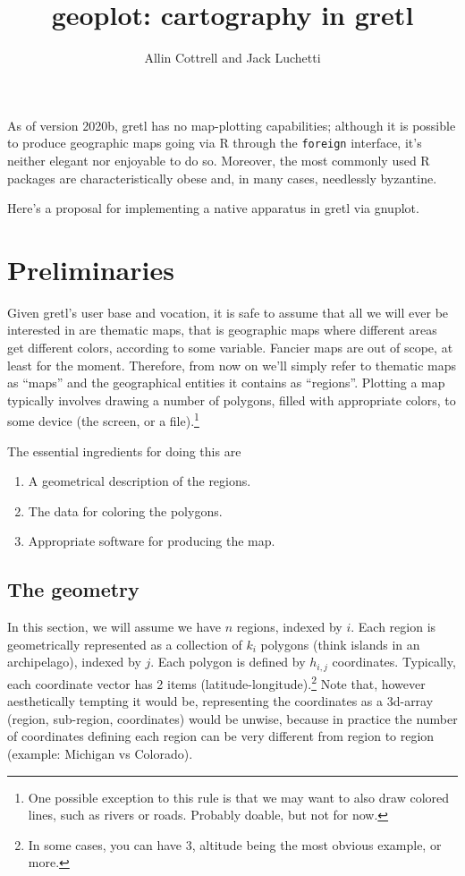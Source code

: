 \documentclass[a4paper]{article}
\title{geoplot: cartography in gretl}
\author{Allin Cottrell and Jack Luchetti}
\begin{document}
\maketitle

As of version 2020b, gretl has no map-plotting capabilities; although
it is possible to produce geographic maps going via R through the
\texttt{foreign} interface, it's neither elegant nor enjoyable to do
so. Moreover, the most commonly used R packages are characteristically
obese and, in many cases, needlessly byzantine.

Here's a proposal for implementing a native apparatus in gretl via gnuplot.

\section{Preliminaries}
\label{sec:prelim}

Given gretl's user base and vocation, it is safe to assume that all we
will ever be interested in are thematic maps, that is geographic maps
where different areas get different colors, according to some
variable. Fancier maps are out of scope, at least for the
moment. Therefore, from now on we'll simply refer to thematic maps as
``maps'' and the geographical entities it contains as
``regions''. Plotting a map typically involves drawing a number of
polygons, filled with appropriate colors, to some device (the screen,
or a file).\footnote{One possible exception to this rule is that we
  may want to also draw colored lines, such as rivers or
  roads. Probably doable, but not for now.}

The essential ingredients for doing this are
\begin{enumerate}
   \item A geometrical description of the regions.
   \item The data for coloring the polygons.
   \item Appropriate software for producing the map. 
\end{enumerate}
   
\subsection{The geometry}
\label{sec:geometry}

In this section, we will assume we have $n$ regions, indexed by
$i$. Each region is geometrically represented as a collection of $k_i$
polygons (think islands in an archipelago), indexed by $j$. Each
polygon is defined by $h_{i,j}$ coordinates. Typically, each
coordinate vector has 2 items (latitude-longitude).\footnote{In some
  cases, you can have 3, altitude being the most obvious example, or
  more.}  Note that, however aesthetically tempting it would be,
representing the coordinates as a 3d-array (region, sub-region,
coordinates) would be unwise, because in practice the number of
coordinates defining each region can be very different from region to
region (example: Michigan vs Colorado).
\end{document}
